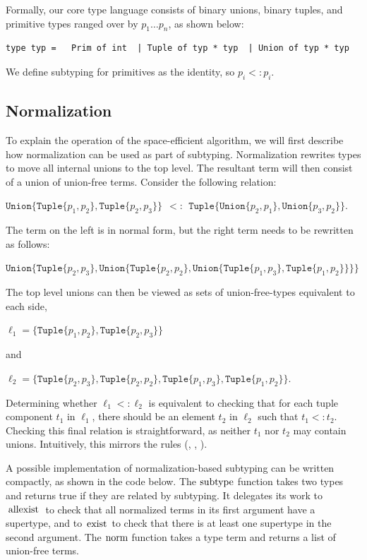 \documentclass[a4paper,english]{lipics-v2019}
\newcommand{\xt}[1]{\texttt{#1}}
\newcommand{\union}[2]{\xt{Union\{}#1,#2\xt{\}}}
\renewcommand{\c}[1]{\ensuremath{\text{\lstinline{#1}}}\xspace}
\newcommand{\tuple}[1]{\xt{Tuple\{}#1\xt{\}}}
\begin{document}
Formally, our core type language consists of binary unions, binary tuples, and
primitive types ranged over by $p_1 \dots p_n$, as shown below:

\medskip
\begin{lstlisting}
type typ =   Prim of int  | Tuple of typ * typ  | Union of typ * typ
\end{lstlisting}
\medskip

We define subtyping for primitives as the identity, so $p_i <: p_i$.

\subsection{Normalization}\label{normalize}

To explain the operation of the space-efficient algorithm, we will first
describe how normalization can be used as part of subtyping. Normalization
rewrites types to move all internal unions to the top level. The resultant
term will then consist of a union of union-free terms. Consider the following
relation:

\medskip
$\union{ \tuple{p_1,p_2}}{\tuple{p_2,p_3}} ~~ <:~~  \tuple{ \union{p_2}{p_1}, \union{p_3}{p_2}}$.
\medskip

\noindent
The term on the left is in normal form, but the right term  needs to be
rewritten as follows:

\medskip
$\union{ \tuple{p_2,p_3}}
  {\union{ \tuple{p_2,p_2}}
    {\union{ \tuple{p_1,p_3}}
           {\tuple{p_1,p_2}}}}$
\medskip

\noindent
The top level unions can then be viewed as sets of union-free-types
equivalent to each side,

\medskip
$\ell_1 = \{  \tuple{p_1,p_2}, \tuple{p_2,p_3}  \}$
\medskip

\noindent and

\medskip
$\ell_2 = \{  \tuple{p_2,p_3}, \tuple{p_2,p_2}, \tuple{p_1,p_3}, 
          \tuple{p_1,p_2} \}$.
\medskip

\noindent Determining whether $\ell_1 <: \ell_2$ is equivalent to checking that for each tuple component $t_1$ in $\ell_1$, there should be an element $t_2$ in $\ell_2$ such
that $t_1 <: t_2$. Checking this final relation is straightforward, as neither
$t_1$ nor $t_2$ may contain unions. Intuitively, this mirrors the 
rules ({\sc [allexist]}, {\sc [existL/R]}, {\sc [tuple]}). 

A possible implementation of normalization-based subtyping can be written
compactly, as shown in the code below.  The \c{subtype} function takes two types and returns true if
they are related by subtyping. It delegates its work to \c{allexist} to
check that all normalized terms in its first argument have a supertype, and
to \c{exist} to check that there is at least one supertype in the second
argument.  The \c{norm} function takes a type term and returns a list of
union-free terms.
\end{document}
